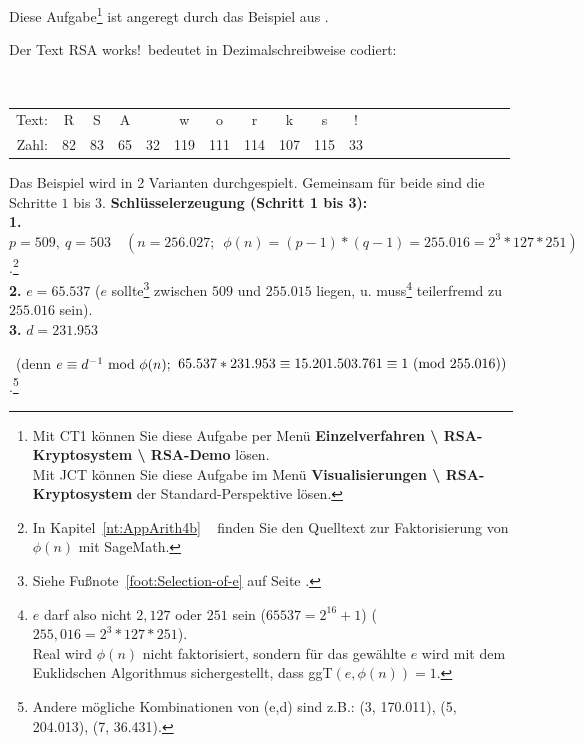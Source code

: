 \begin{refsegment}
 Diese Aufgabe\footnote{%
Mit CT1 können Sie diese Aufgabe per Menü
  \textbf{Einzelverfahren \textbackslash{} RSA-Kryptosystem \textbackslash{}
  RSA-Demo} lösen.\\
  Mit JCT können Sie diese Aufgabe im Menü
  \textbf{Visualisierungen \textbackslash{} RSA-Kryptosystem}
  der Standard-Perspektive lösen.%
}
ist angeregt durch das Beispiel aus \cite[S. 271]{Eckert2014}.

 Der Text \glqq RSA works!\grqq~bedeutet in Dezimalschreibweise codiert:

{\tt
\begin{tabular}{rcccccccccccccccccccc}
{\rm Text:} & R & S & A &   & w & o & r & k & s & !\\
{\rm Zahl:} & 82 & 83 & 65 & 32 & 119 & 111 & 114 & 107 & 115 & 33
\end{tabular} } %

 Das Beispiel wird in 2 Varianten durchgespielt. Gemeinsam für beide sind die Schritte $1$ bis $3$.
 \textbf{Schlüsselerzeugung (Schritt 1 bis 3):}\\\label{SrcArith4b}%
\textbf{1.} $p=509,~q=503 \quad (n= 256.027; \; ~\phi(n)=(p-1)*(q-1)=255.016=2^3*127*251)$.\footnote{%
  In Kapitel~\ref{nt:AppArith4b} \glqq {}\grqq~
  finden Sie den Quelltext zur Faktorisierung von $\phi(n)$ mit SageMath.
}\\
\textbf{2.} $e=65.537$ ($e$ sollte\footnote{%
                Siehe Fußnote~\ref{foot:Selection-of-e} auf Seite
                \pageref{foot:Selection-of-e}.}
                zwischen $509$ und $255.015$ liegen, u. muss\footnote{%
                $e$ darf also nicht $2, 127$ oder $251$ sein
                ($65537 = 2^{16}+1$) ($255,016 = 2^{3}*127*251$).\\
                Real wird $\phi(n)$ nicht faktorisiert, sondern für das gewählte
                $e$ wird mit dem Euklidschen Algorithmus sichergestellt, dass
                ggT$(e,\phi(n))=1$.
                }
      teilerfremd zu $255.016$ sein).\\
\textbf{3.} $d=231.953$\\
\strut\quad\ (denn $e \equiv d^{-1}{\rm ~mod~}\phi(n);$
\mbox{}\quad $65.537*231.953 \equiv 15.201.503.761 \equiv 1
{\rm ~(mod~}255.016))$.\footnote{%
Andere mögliche Kombinationen von (e,d) sind z.B.: (3, 170.011), (5, 204.013), (7, 36.431).
}



\end{refsegment}
